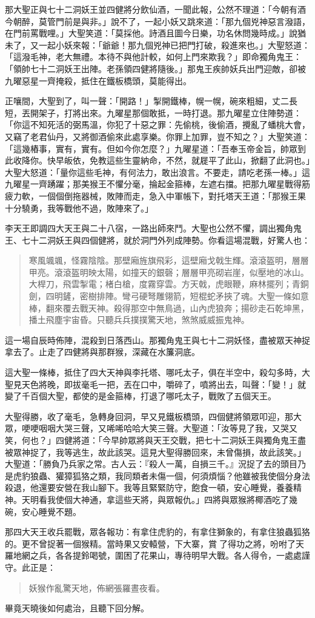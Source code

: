 那大聖正與七十二洞妖王並四健將分飲仙酒，一聞此報，公然不理道：「今朝有酒今朝醉，莫管門前是與非。」說不了，一起小妖又跳來道：「那九個兇神惡言潑語，在門前罵戰哩。」大聖笑道：「莫採他。詩酒且圖今日樂，功名休問幾時成。」說猶未了，又一起小妖來報：「爺爺！那九個兇神已把門打破，殺進來也。」大聖怒道：「這潑毛神，老大無禮。本待不與他計較，如何上門來欺我？」即命獨角鬼王：「領帥七十二洞妖王出陣。老孫領四健將隨後。」那鬼王疾帥妖兵出門迎敵，卻被九曜惡星一齊掩殺，抵住在鐵板橋頭，莫能得出。

正嚷間，大聖到了，叫一聲：「開路！」掣開鐵棒，幌一幌，碗來粗細，丈二長短，丟開架子，打將出來。九曜星那個敢抵，一時打退。那九曜星立住陣勢道：「你這不知死活的弼馬溫，你犯了十惡之罪：先偷桃，後偷酒，攪亂了蟠桃大會，又竊了老君仙丹，又將御酒偷來此處享樂。你罪上加罪，豈不知之？」大聖笑道：「這幾樁事，實有，實有。但如今你怎麼？」九曜星道：「吾奉玉帝金旨，帥眾到此收降你。快早皈依，免教這些生靈納命，不然，就屣平了此山，掀翻了此洞也。」大聖大怒道：「量你這些毛神，有何法力，敢出浪言。不要走，請吃老孫一棒。」這九曜星一齊踴躍；那美猴王不懼分毫，掄起金箍棒，左遮右擋。把那九曜星戰得筋疲力軟，一個個倒拖器械，敗陣而走，急入中軍帳下，對托塔天王道：「那猴王果十分驍勇，我等戰他不過，敗陣來了。」

李天王即調四大天王與二十八宿，一路出師來鬥。大聖也公然不懼，調出獨角鬼王、七十二洞妖王與四個健將，就於洞門外列成陣勢。你看這場混戰，好驚人也：
\begin{quote}
寒風颯颯，怪霧陰陰。那壁廂旌旗飛彩，這壁廂戈戟生輝。滾滾盔明，層層甲亮。滾滾盔明映太陽，如撞天的銀磬；層層甲亮砌岩崖，似壓地的冰山。大桿刀，飛雲掣電；楮白槍，度霧穿雲。方天戟，虎眼鞭，麻林擺列；青銅劍，四明鏟，密樹排陣。彎弓硬弩雕翎箭，短棍蛇矛挾了魂。大聖一條如意棒，翻來覆去戰天神。殺得那空中無鳥過，山內虎狼奔；揚砂走石乾坤黑，播土飛塵宇宙昏。只聽兵兵撲撲驚天地，煞煞威威振鬼神。
\end{quote}

這一場自辰時佈陣，混殺到日落西山。那獨角鬼王與七十二洞妖怪，盡被眾天神捉拿去了。止走了四健將與那群猴，深藏在水簾洞底。

這大聖一條棒，抵住了四大天神與李托塔、哪吒太子，俱在半空中，殺勾多時，大聖見天色將晚，即拔毫毛一把，丟在口中，嚼碎了，噴將出去，叫聲：「變！」就變了千百個大聖，都使的是金箍棒，打退了哪吒太子，戰敗了五個天王。

大聖得勝，收了毫毛，急轉身回洞，早又見鐵板橋頭，四個健將領眾叩迎，那大眾，哽哽咽咽大哭三聲，又唏唏哈哈大笑三聲。大聖道：「汝等見了我，又哭又笑，何也？」四健將道：「今早帥眾將與天王交戰，把七十二洞妖王與獨角鬼王盡被眾神捉了，我等逃生，故此該哭。這見大聖得勝回來，未曾傷損，故此該笑。」大聖道：「勝負乃兵家之常。古人云：『殺人一萬，自損三千。』況捉了去的頭目乃是虎豹狼蟲、獾獐狐狢之類，我同類者未傷一個，何須煩惱？他雖被我使個分身法殺退，他還要安營在我山腳下。我等且緊緊防守，飽食一頓，安心睡覺，養養精神。天明看我使個大神通，拿這些天將，與眾報仇。」四將與眾猴將椰酒吃了幾碗，安心睡覺不題。

那四大天王收兵罷戰，眾各報功：有拿住虎豹的，有拿住獅象的，有拿住狼蟲狐狢的。更不曾捉著一個猴精。當時果又安轅營，下大寨，賞𤛮了得功之將，吩咐了天羅地網之兵，各各提鈴喝號，圍困了花果山，專待明早大戰。各人得令，一處處謹守。此正是：
\begin{quote}
妖猴作亂驚天地，佈網張羅晝夜看。
\end{quote}

畢竟天曉後如何處治，且聽下回分解。
